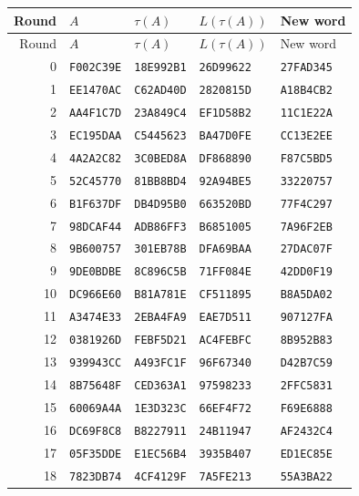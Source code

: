 \begingroup\small
\begin{longtable}{rllll}
\toprule
Round & $A$ & $\tau(A)$ & $L(\tau(A))$ & New word\\
\midrule
\endfirsthead
\toprule
Round & $A$ & $\tau(A)$ & $L(\tau(A))$ & New word\\
\midrule
\endhead
0 & \texttt{F002C39E} & \texttt{18E992B1} & \texttt{26D99622} & \texttt{27FAD345}\\
1 & \texttt{EE1470AC} & \texttt{C62AD40D} & \texttt{2820815D} & \texttt{A18B4CB2}\\
2 & \texttt{AA4F1C7D} & \texttt{23A849C4} & \texttt{EF1D58B2} & \texttt{11C1E22A}\\
3 & \texttt{EC195DAA} & \texttt{C5445623} & \texttt{BA47D0FE} & \texttt{CC13E2EE}\\
4 & \texttt{4A2A2C82} & \texttt{3C0BED8A} & \texttt{DF868890} & \texttt{F87C5BD5}\\
5 & \texttt{52C45770} & \texttt{81BB8BD4} & \texttt{92A94BE5} & \texttt{33220757}\\
6 & \texttt{B1F637DF} & \texttt{DB4D95B0} & \texttt{663520BD} & \texttt{77F4C297}\\
7 & \texttt{98DCAF44} & \texttt{ADB86FF3} & \texttt{B6851005} & \texttt{7A96F2EB}\\
8 & \texttt{9B600757} & \texttt{301EB78B} & \texttt{DFA69BAA} & \texttt{27DAC07F}\\
9 & \texttt{9DE0BDBE} & \texttt{8C896C5B} & \texttt{71FF084E} & \texttt{42DD0F19}\\
10 & \texttt{DC966E60} & \texttt{B81A781E} & \texttt{CF511895} & \texttt{B8A5DA02}\\
11 & \texttt{A3474E33} & \texttt{2EBA4FA9} & \texttt{EAE7D511} & \texttt{907127FA}\\
12 & \texttt{0381926D} & \texttt{FEBF5D21} & \texttt{AC4FEBFC} & \texttt{8B952B83}\\
13 & \texttt{939943CC} & \texttt{A493FC1F} & \texttt{96F67340} & \texttt{D42B7C59}\\
14 & \texttt{8B75648F} & \texttt{CED363A1} & \texttt{97598233} & \texttt{2FFC5831}\\
15 & \texttt{60069A4A} & \texttt{1E3D323C} & \texttt{66EF4F72} & \texttt{F69E6888}\\
16 & \texttt{DC69F8C8} & \texttt{B8227911} & \texttt{24B11947} & \texttt{AF2432C4}\\
17 & \texttt{05F35DDE} & \texttt{E1EC56B4} & \texttt{3935B407} & \texttt{ED1EC85E}\\
18 & \texttt{7823DB74} & \texttt{4CF4129F} & \texttt{7A5FE213} & \texttt{55A3BA22}\\

\end{longtable}
